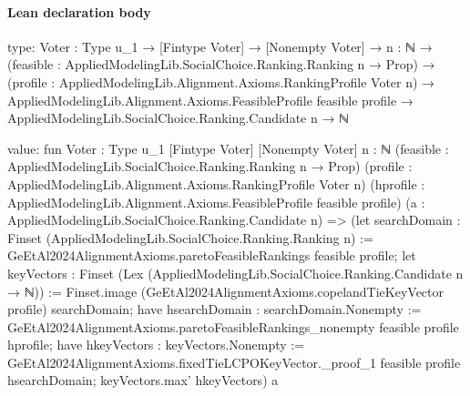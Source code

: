 \documentclass[10pt]{article}
\begin{document}
\paragraph{Lean declaration body}
\begin{ReviewVerbatim}
type:
{Voter : Type u_1} →
  [Fintype Voter] →
    [Nonempty Voter] →
      {n : ℕ} →
        (feasible : AppliedModelingLib.SocialChoice.Ranking.Ranking n → Prop) →
          (profile : AppliedModelingLib.Alignment.Axioms.RankingProfile Voter n) →
            AppliedModelingLib.Alignment.Axioms.FeasibleProfile feasible profile →
              AppliedModelingLib.SocialChoice.Ranking.Candidate n → ℕ

value:
fun {Voter : Type u_1} [Fintype Voter] [Nonempty Voter] {n : ℕ}
    (feasible : AppliedModelingLib.SocialChoice.Ranking.Ranking n → Prop)
    (profile : AppliedModelingLib.Alignment.Axioms.RankingProfile Voter n)
    (hprofile : AppliedModelingLib.Alignment.Axioms.FeasibleProfile feasible profile)
    (a : AppliedModelingLib.SocialChoice.Ranking.Candidate n) =>
  (let searchDomain : Finset (AppliedModelingLib.SocialChoice.Ranking.Ranking n) :=
      GeEtAl2024AlignmentAxioms.paretoFeasibleRankings feasible profile;
    let keyVectors : Finset (Lex (AppliedModelingLib.SocialChoice.Ranking.Candidate n → ℕ)) :=
      Finset.image (GeEtAl2024AlignmentAxioms.copelandTieKeyVector profile) searchDomain;
    have hsearchDomain : searchDomain.Nonempty :=
      GeEtAl2024AlignmentAxioms.paretoFeasibleRankings_nonempty feasible profile hprofile;
    have hkeyVectors : keyVectors.Nonempty :=
      GeEtAl2024AlignmentAxioms.fixedTieLCPOKeyVector._proof_1 feasible profile hsearchDomain;
    keyVectors.max' hkeyVectors)
    a
\end{ReviewVerbatim}
\end{document}
